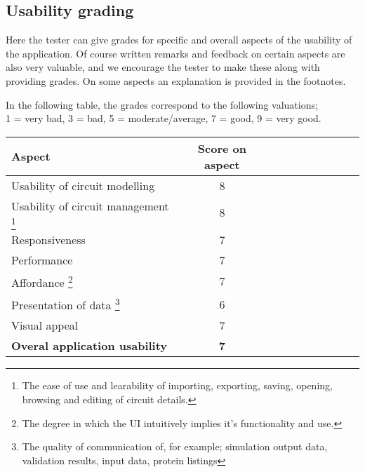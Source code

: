\documentclass[a4paper]{article}
\begin{document}
\vfill
\subsection{Usability grading}
Here the tester can give grades for specific and overall aspects of the usability of the application. Of course written remarks and feedback on certain aspects are also very valuable, and we encourage the tester to make these along with providing grades. On some aspects an explanation is provided in the footnotes.

In the following table, the grades correspond to the following valuations;\\ 1 = very bad, 3 = bad, 5 = moderate/average, 7 = good, 9 = very good.
\begin{center}
\begin{tabularx}{\textwidth}{p{10cm} cc cc c cc cc} \toprule
\textbf{Aspect} & \multicolumn{1}{c}{\textbf{Score on aspect}} \\ \midrule
Usability of circuit modelling &8 \\ \midrule
Usability of circuit management \footnote{The ease of use and learability of importing, exporting, saving, opening, browsing and editing of circuit details.} &8 \\ \midrule
Responsiveness &7 \\ \midrule
Performance &7 \\ \midrule
Affordance \footnote{The degree in which the UI intuitively implies it's functionality and use.} &7 \\ \midrule
Presentation of data \footnote{The quality of communication of, for example; simulation output data, validation results, input data, protein listings} &6 \\ \midrule
Visual appeal &7 \\ \midrule
\textbf{Overal application usability} &\textbf{7} \\ \bottomrule
\end{tabularx}
\end{center}
\end{document}
